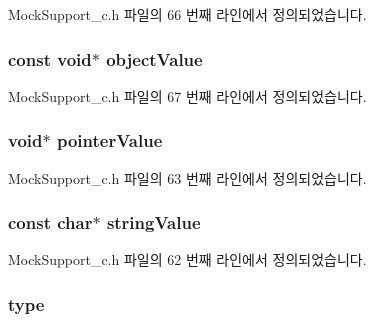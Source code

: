 Mock\+Support\+\_\+c.\+h 파일의 66 번째 라인에서 정의되었습니다.

\subsubsection[{\texorpdfstring{object\+Value}{objectValue}}]{\setlength{\rightskip}{0pt plus 5cm}const void$\ast$ object\+Value}\hypertarget{struct_s_mock_value__c_a7bad589b252a4ec87473ea7e139e6d3b}{}\label{struct_s_mock_value__c_a7bad589b252a4ec87473ea7e139e6d3b}


Mock\+Support\+\_\+c.\+h 파일의 67 번째 라인에서 정의되었습니다.

\subsubsection[{\texorpdfstring{pointer\+Value}{pointerValue}}]{\setlength{\rightskip}{0pt plus 5cm}void$\ast$ pointer\+Value}\hypertarget{struct_s_mock_value__c_a2ce1b3b8967c64ad0f491d7b119c5d34}{}\label{struct_s_mock_value__c_a2ce1b3b8967c64ad0f491d7b119c5d34}


Mock\+Support\+\_\+c.\+h 파일의 63 번째 라인에서 정의되었습니다.

\subsubsection[{\texorpdfstring{string\+Value}{stringValue}}]{\setlength{\rightskip}{0pt plus 5cm}const char$\ast$ string\+Value}\hypertarget{struct_s_mock_value__c_ac681defebf85c29e3a3e79d944ce005a}{}\label{struct_s_mock_value__c_ac681defebf85c29e3a3e79d944ce005a}


Mock\+Support\+\_\+c.\+h 파일의 62 번째 라인에서 정의되었습니다.

\subsubsection[{\texorpdfstring{type}{type}}]{ type}\hypertarget{struct_s_mock_value__c_a264c0dbbb2fed64824fc5d5a17786d7d}{}\label{struct_s_mock_value__c_a264c0dbbb2fed64824fc5d5a17786d7d}


